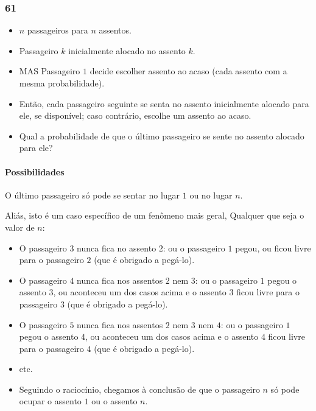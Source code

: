 \documentclass[
  11pt]{report}
\begin{document}
\hypertarget{section-8}{%
\subsubsection*{61}\label{section-8}}

\begin{rmdbox}

\begin{itemize}
\item
  $n$ passageiros para $n$ assentos.
\item
  Passageiro $k$ inicialmente alocado no assento $k$.
\item
  MAS Passageiro $1$ decide escolher assento ao acaso (cada assento com a mesma probabilidade).
\item
  Então, cada passageiro seguinte se senta no assento inicialmente alocado para ele, se disponível; caso contrário, escolhe um assento ao acaso.
\item
  Qual a probabilidade de que o último passageiro se sente no assento alocado para ele?
\end{itemize}

\end{rmdbox}

\hypertarget{possibilidades}{%
\paragraph*{Possibilidades}\label{possibilidades}}

O último passageiro só pode se sentar no lugar $1$ ou no lugar $n$.

Aliás, isto é um caso específico de um fenômeno mais geral, Qualquer que seja o valor de $n$:

\begin{itemize}
\item
  O passageiro $3$ nunca fica no assento $2$: ou o passageiro $1$ pegou, ou ficou livre para o passageiro $2$ (que é obrigado a pegá-lo).
\item
  O passageiro $4$ nunca fica nos assentos $2$ nem $3$: ou o passageiro $1$ pegou o assento $3$, ou aconteceu um dos casos acima e o assento $3$ ficou livre para o passageiro $3$ (que é obrigado a pegá-lo).
\item
  O passageiro $5$ nunca fica nos assentos $2$ nem $3$ nem $4$: ou o passageiro $1$ pegou o assento $4$, ou aconteceu um dos casos acima e o assento $4$ ficou livre para o passageiro $4$ (que é obrigado a pegá-lo).
\item
  etc.
\item
  Seguindo o raciocínio, chegamos à conclusão de que o passageiro $n$ só pode ocupar o assento $1$ ou o assento $n$.
\end{itemize}
\end{document}
